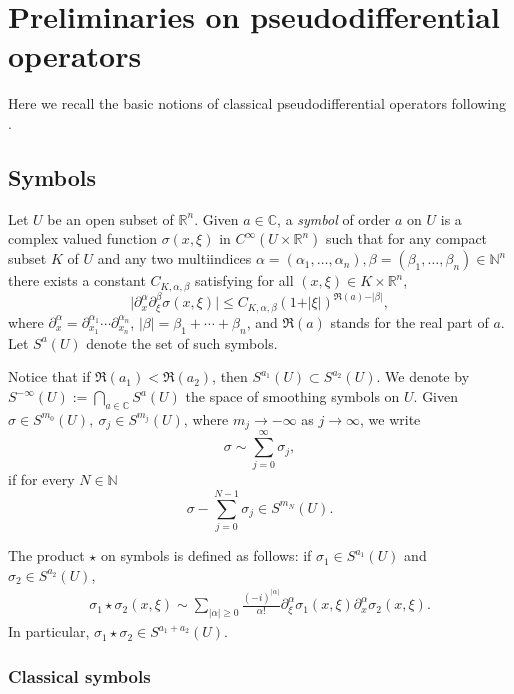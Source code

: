 \documentclass[pdftex]{sigma}
\begin{document}
\section{Preliminaries on pseudodif\/ferential operators}\label{section2}

Here we recall the basic notions of classical pseudodif\/ferential operators following \cite{Shubin}.

\subsection{Symbols}

Let $U$ be an open subset of $\mathbb{R}^n$. Given $a\in\mathbb{C}$, a {\it symbol} of order $a$ on $U$ is a complex valued function $\sigma(x,\xi)$ in $C^{\infty}(U\times\mathbb{R}^n)$ such that for any compact subset $K$ of $U$ and any two multiindices $\alpha=(\alpha_1,\dots,\alpha_n), \beta=(\beta_1,\dots,\beta_n) \in \mathbb{N}^n$ there exists a constant $C_{K, \alpha, \beta}$ satisfying for all $(x,\xi)\in K\times\mathbb{R}^n$,
\[
\big| \partial_x^{\alpha}\partial_{\xi}^{\beta}\sigma(x,\xi) \big| \leq C_{K, \alpha, \beta}(1+ \vert \xi \vert )^{\Re(a)- \vert \beta\vert},
\]
where $\partial_x^{\alpha}=\partial_{x_1}^{\alpha_1}\cdots\partial_{x_n}^{\alpha_n}$, $\vert \beta\vert = \beta_1+\cdots+\beta_n$, and $\Re(a)$ stands for the real part of $a$. Let $S^{a}(U)$ denote the set of such symbols.

Notice that if $\Re(a_1)<\Re(a_2)$, then $S^{a_1}(U)\subset S^{a_2}(U)$. We denote by $S^{-\infty}(U):= \bigcap\limits_{a \in \mathbb{C}}S^a(U)$ the space of smoothing symbols on $U$. Given $\sigma\in S^{m_0}(U),\ \sigma_j\in S^{m_j}(U)$, where $m_j\to-\infty$ as $j\to\infty$, we write
\[
\sigma\sim\sum_{j=0}^\infty\sigma_j,
\]
if for every $N\in\mathbb{N}$
\[
\sigma-\sum_{j=0}^{N-1}\sigma_j\in S^{m_N}(U).
\]

The product $\star$ on symbols is def\/ined as follows: if $\sigma_1 \in S^{a_1}(U)$ and $\sigma_2\in S^{a_2}(U)$,
\begin{gather}
\sigma_1\star \sigma_2(x, \xi) \sim \sum_{|\alpha|\geq0}\frac{(-i)^{\vert\alpha\vert}}{\alpha!}\partial_{\xi}^{\alpha} \sigma_1(x,\xi)\partial_x^{\alpha}\sigma_2(x,\xi). \label{eq:starproduct}
\end{gather}
In particular, $\sigma_1\star \sigma_2 \in S^{a_1 + a_2}(U)$.

\subsubsection{Classical symbols}\label{sectionsymbols}
\end{document}
